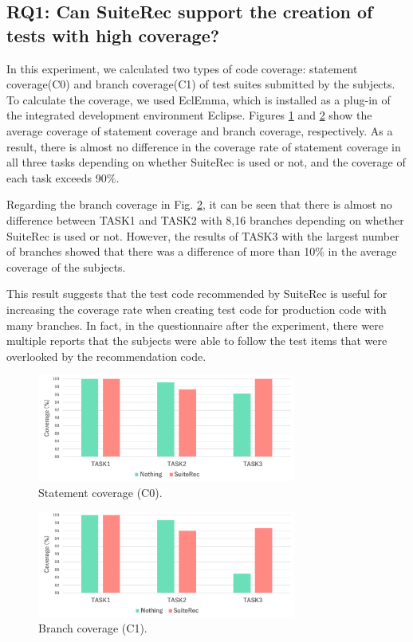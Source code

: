 \documentclass[conference]{IEEEtran}
\begin{document}
\subsection{RQ1: Can SuiteRec support the creation of tests with high coverage?}
In this experiment, we calculated two types of code coverage: statement coverage(C0) and branch coverage(C1) of test suites submitted by the subjects. To calculate the coverage, we used EclEmma\cite{b11}, which is installed as a plug-in of the integrated development environment Eclipse\cite{b21}. Figures \ref{fig5} and \ref{fig6} show the average coverage of statement coverage and branch coverage, respectively. As a result, there is almost no difference in the coverage rate of statement coverage in all three tasks depending on whether SuiteRec is used or not, and the coverage of each task exceeds 90\%.

Regarding the branch coverage in Fig. \ref{fig6}, it can be seen that there is almost no difference between TASK1 and TASK2 with 8,16 branches depending on whether SuiteRec is used or not. However, the results of TASK3 with the largest number of branches showed that there was a difference of more than 10\% in the average coverage of the subjects.

This result suggests that the test code recommended by SuiteRec is useful for increasing the coverage rate when creating test code for production code with many branches. In fact, in the questionnaire after the experiment, there were multiple reports that the subjects were able to follow the test items that were overlooked by the recommendation code.


\begin{figure}[htbp]
\centerline{\includegraphics[width=8.5cm]{C0.pdf}}
\caption{Statement coverage (C0).}
\label{fig5}
\end{figure}

\begin{figure}[htbp]
\centerline{\includegraphics[width=8.5cm]{C1.pdf}}
\caption{Branch coverage (C1).}
\label{fig6}
\end{figure}
\end{document}
